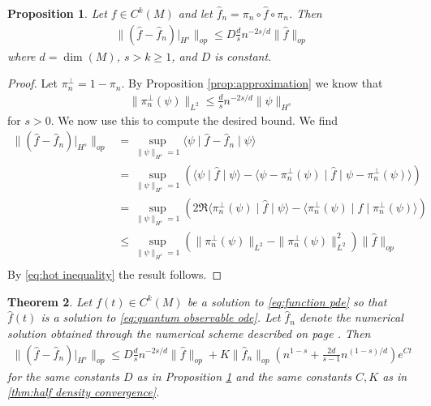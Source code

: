 \documentclass[12pt]{amsart}
\newtheorem{thm}{Theorem}[section]
\newtheorem{prop}[thm]{Proposition}
\begin{document}
\begin{prop} \label{prop:function approximation}
	Let $f \in C^{k}(M)$ and let $\hat{f}_{n} = \pi_{n} \circ \hat{f} \circ \pi_{n}$.  Then
	\begin{align}
		\| ( \hat{f} - \hat{f}_{n} )|_{H^{s}} \|_{op} \leq D \frac{d}{s} n^{-2s/d} \| \hat{f} \|_{op}
	\end{align}
	where $d= \dim(M)$, $s > k \geq 1$, and $D$ is constant.
\end{prop}
\begin{proof}
	Let $\pi_{n}^{\perp} = 1 - \pi_{n}$.  By Proposition \ref{prop:approximation} we know that
	\begin{align}
		\| \pi_{n}^{\perp}(\psi) \|_{L^{2}} \leq \frac{d}{s} n^{-2s/d} \| \psi \|_{H^{s}} \label{eq:hot inequality}
	\end{align}
	for $s>0$.  We now use this to compute the desired bound.  We find
	\begin{align}
		\| (\hat{f} - \hat{f}_{n})|_{H^{s}} \|_{op} &= \sup_{\| \psi \|_{H^{s}}=1} \langle \psi \mid \hat{f} - \hat{f}_{n} \mid \psi \rangle \\
			&= \sup_{\| \psi \|_{H^{s}}=1} \left( \langle \psi \mid \hat{f}  \mid \psi \rangle - \langle \psi - \pi_{n}^{\perp}(\psi) \mid \hat{f} \mid \psi - \pi_{n}^{\perp}(\psi) \rangle \right) \\
			&= \sup_{\| \psi \|_{H^{s}}=1} \left( 2 \Re \langle \pi_{n}^{\perp}(\psi) \mid \hat{f} \mid \psi \rangle - \langle \pi_{n}^{\perp}(\psi) \mid \hat{f} \mid \pi_{n}^{\perp}(\psi) \rangle \right) \\
			&\leq \sup_{\| \psi \|_{H^{s}}=1}  ( \| \pi_{n}^{\perp}(\psi) \|_{L^{2}}- \| \pi_{n}^{\perp}(\psi) \|_{L^{2}}^{2} ) \| \hat{f} \|_{op} \\
	\end{align}
	By \eqref{eq:hot inequality} the result follows.
\end{proof}

\begin{thm} \label{thm:function convergence}
	Let $f(t) \in C^{k}(M)$ be a solution to \eqref{eq:function pde} so that $\hat{f}(t)$ is a solution to \eqref{eq:quantum observable ode}.
	Let $\hat{f}_{n}$ denote the numerical solution obtained through the numerical scheme described on page \pageref{function scheme}.
	Then
	\begin{align}
		\| ( \hat{f} - \hat{f}_{n})|_{H^{s}} \|_{op} \leq D \frac{d}{s} n^{-2s/d} \| \hat{f} \|_{op}+  K \| \hat{f}_{n} \|_{op} \left( n^{1-s} + \frac{2d}{s -1} n^{(1-s)/d} \right) e^{Ct}
	\end{align}
	for the same constants $D$ as in Proposition \ref{prop:function approximation} and the same constants $C,K$ as in \ref{thm:half density convergence}.
\end{thm}
\end{document}
